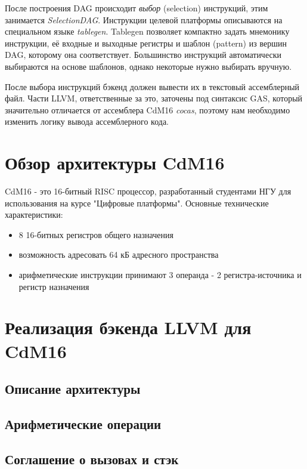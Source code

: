 \documentclass[a4paper,14pt]{extarticle}
\begin{document}
После построения DAG происходит \emph{выбор} (selection) инструкций, этим занимается \emph{SelectionDAG}. Инструкции целевой платформы описываются на специальном языке \emph{tablegen}. Tablegen позволяет компактно задать мнемонику инструкции, её входные и выходные регистры и шаблон (pattern) из вершин DAG, которому она соответствует. Большинство инструкций автоматически выбираются на основе шаблонов, однако некоторые нужно выбирать вручную.

После выбора инструкций бэкенд должен вывести их в текстовый ассемблерный файл. Части LLVM, ответственные за это, заточены под синтаксис GAS, который значительно отличается от ассемблера CdM16 \emph{cocas}, поэтому нам необходимо изменить логику вывода ассемблерного кода.


\pagebreak
\section{Обзор архитектуры CdM16}

CdM16 - это 16-битный RISC процессор, разработанный студентами НГУ для использования на курсе "Цифровые платформы". Основные технические характеристики:
\begin{itemize}
	\item 8 16-битных регистров общего назначения
	\item возможность адресовать 64 кБ адресного пространства
	\item арифметические инструкции принимают 3 операнда - 2 регистра-источника и регистр назначения
	
\end{itemize}

\pagebreak
\section{Реализация бэкенда LLVM для CdM16}
\subsection{Описание архитектуры}
\subsection{Арифметические операции}
\subsection{Соглашение о вызовах и стэк}
\end{document}
